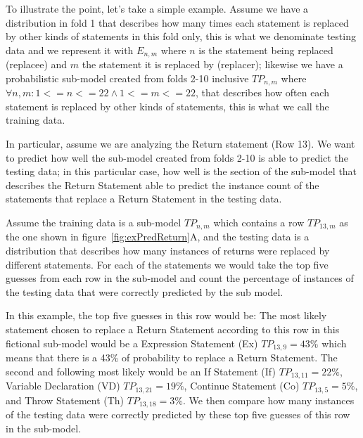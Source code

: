\documentclass[conference]{IEEEtran}
\begin{document}
To illustrate the point, let's take a simple example. Assume we have a 
distribution in fold 1 that describes how many times each statement is replaced 
by other kinds of statements in this fold 
only, this is what we denominate testing data and we represent it with $E_{n,m}$ 
where $n$ is the statement being replaced (replacee) and $m$ the statement it is 
replaced by (replacer); likewise we have a probabilistic sub-model created from 
folds 2-10 inclusive $TP_{n,m}$ where $\forall n,m: 1<=n<=22 \land 1<=m<=22$, 
that describes how often each statement is replaced by 
other kinds of statements, this is what we call the training data. 

In 
particular, assume we are analyzing the Return statement (Row 13). We want to 
predict 
how well the sub-model created from folds 2-10 is able to predict the testing 
data; in this particular case, how well is the section of the sub-model that 
describes the Return Statement able to predict the instance count of the 
statements that replace a Return Statement in the testing data.

Assume the training data is a sub-model $TP_{n,m}$ which contains a row 
$TP_{13,m}$ as the one shown in figure~\ref{fig:exPredReturn}A, and the testing data is a distribution that describes 
how many instances of returns were replaced by different statements.
For each of the statements we would take the top five guesses from each row in 
the sub-model and count the percentage of instances of the testing data that were correctly 
predicted by the sub model. 

In this example, the top five guesses in this row would be: The most 
likely statement chosen to replace a Return Statement according to this row in 
this fictional sub-model would be a Expression Statement (Ex) $TP_{13,9} = 43\%$ 
which means that there is a 43\% of probability to replace a Return Statement. 
The second and following most likely would be an If Statement (If) $TP_{13,11} = 22\%$, Variable Declaration (VD)  $TP_{13,21} = 19\%$, 
Continue Statement (Co)  $TP_{13,5} = 5\%$, and Throw Statement (Th) $TP_{13,18} = 3\%$. We then compare how many instances of the testing data were correctly predicted 
by these top five guesses of this row in the sub-model. 
\end{document}
